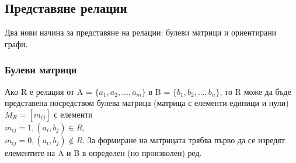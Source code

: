 \documentclass[fleqn, 12pt]{article}
\theoremstyle{definition}
\begin{document}
\subsection{Представяне релации}
Два нови начина за представяне на релации: булеви матрици и ориентирани графи.

\subsubsection{Булеви матрици}
Ако R е релация от A = $\{a_1, a_2, ..., a_m\}$ в B = $\{b_1, b_2, ..., b_n\}$, то R може да бъде представена посредством булева матрица (матрица с елементи единици и нули)\\
$M_R= [m_{ij}]$ с елементи \\
$m_{ij}= 1, (a_i, b_j) \in R$, \\
$m_{ij}= 0, (a_i, b_j) \notin R$.
За формиране на матрицата трябва първо да се изредят елементите на A и B в определен (но произволен) ред.
\end{document}
